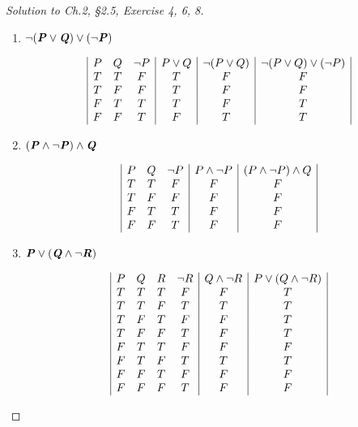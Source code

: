 \documentclass[12pt]{amsart}
\numberwithin{equation}{section}
\theoremstyle{definition}
\theoremstyle{remark}
\begin{document}
\begin{proof}[Solution to Ch.2, \S 2.5,  Exercise 4, 6, 8] \ \\

\begin{enumerate}

\item[4.]
$ \lnot (\textbf{\textit{P}} \lor \textbf{\textit{Q}}) \lor (\lnot \textbf{\textit{P}}) $

\begin{displaymath}
\begin{array}{|c c c|c|c|c|}
P & Q & \lnot P & P \lor Q & \lnot (P \lor Q) & \lnot (P \lor Q) \lor (\lnot P) \\
T & T & F & T & F & F \\
T & F & F & T & F & F \\
F & T & T & T & F & T \\
F & F & T & F & T & T
\end{array}
\end{displaymath}

\item[6.]
$ (\textbf{\textit{P}} \land \lnot \textbf{\textit{P}}) \land \textbf{\textit{Q}} $

\begin{displaymath}
\begin{array}{|c c c|c|c|}
P & Q & \lnot P & P \land \lnot P & (P \land \lnot P) \land Q \\
T & T & F & F & F \\
T & F & F & F & F \\
F & T & T & F & F \\
F & F & T & F & F
\end{array}
\end{displaymath}

\item[8.]
$ \textbf{\textit{P}} \lor (\textbf{\textit{Q}} \land \lnot \textbf{\textit{R}}) $

\begin{displaymath}
\begin{array}{|c c c c|c|c|}
P & Q & R & \lnot R & Q \land \lnot R & P \lor (Q \land \lnot R)\\
T & T & T & F & F & T \\
T & T & F & T & T & T \\
T & F & T & F & F & T \\
T & F & F & T & F & T \\
F & T & T & F & F & F \\
F & T & F & T & T & T \\
F & F & T & F & F & F \\
F & F & F & T & F & F \\
\end{array}
\end{displaymath}

\end{enumerate}


\end{proof}
\end{document}
